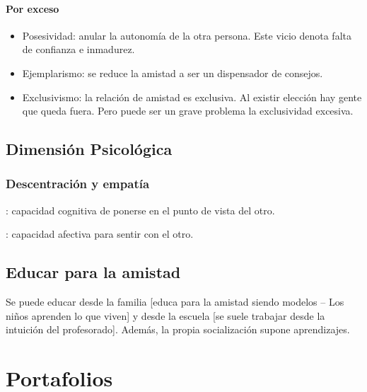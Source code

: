 \documentclass[palatino]{apuntesURJC}
\begin{document}
\subsubsection{Por exceso}

\begin{itemize}
	\item Posesividad: anular la autonomía de la otra persona.
	\subitem Este vicio denota falta de confianza e inmadurez.
	\item Ejemplarismo: se reduce la amistad a ser un dispensador de consejos.
	\item Exclusivismo: la relación de amistad es exclusiva. Al existir elección hay gente que queda fuera. 
	Pero puede ser un grave problema la exclusividad excesiva.
\end{itemize}


\section{Dimensión Psicológica}

\subsection{Descentración y empatía}

: capacidad cognitiva de ponerse en el punto de vista del otro.

: capacidad afectiva para sentir con el otro.


\section{Educar para la amistad}

Se puede educar desde la familia [educa para la amistad siendo modelos -- Los niños aprenden lo que viven]  y desde la escuela [se suele trabajar desde la intuición del profesorado].
%
Además, la propia socialización supone aprendizajes.



\appendix



\chapter{Portafolios}



\printindex
\end{document}
